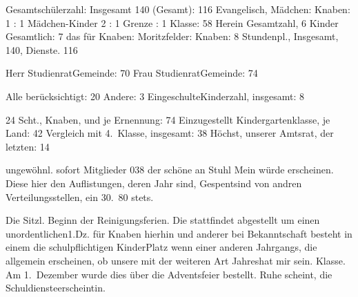 

Gesamtschülerzahl: Insgesamt 140 (Gesamt): 116\ob
Evangelisch\unsicher, Mädchen\unsicher:\ob
Knaben:                       1 : 1\ob
Mädchen-Kinder                2 : 1\ob
Grenze : 1\ob
Klasse:    58\ob
Herein Gesamtzahl, 6 Kinder Gesamtlich\unsicher:   7\ob
das für Knaben:\ob
Moritzfelder\unsicher:\ob
Knaben:                                       8\ob
Stundenpl., Insgesamt\unsicher, 140, Dienste. 116

Herr Studienrat\unsicher Gemeinde:                  70\ob
Frau Studienrat\unsicher Gemeinde:                  74

Alle berücksichtigt:                          20\ob
Andere:                                        3\ob
Eingeschulte\unsicher Kinderzahl, insgesamt\unsicher:      8

24 Scht.\unsicher, Knaben, und je Ernennung\unsicher:  74\ob
Einzugestellt Kindergartenklasse, je Land\unsicher:    42\ob
Vergleich mit 4.\ Klasse, insgesamt\unsicher:          38\ob
Höchst, unserer Amtsrat\unsicher, der letzten\unsicher:    14

ungewöhnl. sofort Mitglieder 038 der schöne an Stuhl\ob
Mein würde erscheinen.\ob
Diese hier den Auflistungen, deren Jahr sind,\ob
Gespent\unsicher sind von andren Verteilungsstellen,\ob
ein 30.\ 80 stets.

Die Sitzl. Beginn der Reinigungsferien. Die stattfindet\ob
abgestellt um einen unordentlichen\unsicher 1.Dz.\ob
für Knaben hierhin und anderer bei Bekanntschaft\ob
besteht in einem die schulpflichtigen Kinder\unsicher Platz\ob
wenn einer anderen Jahrgangs, die allgemein erscheinen,\ob
ob unsere mit der weiteren Art Jahres\unsicher hat mir sein.\ob
Klasse.\ob
Am 1.\ Dezember wurde dies über die Adventsfeier bestellt.\ob
Ruhe scheint, die Schuldienste\unsicher erscheint\unsicher in.
\pend
